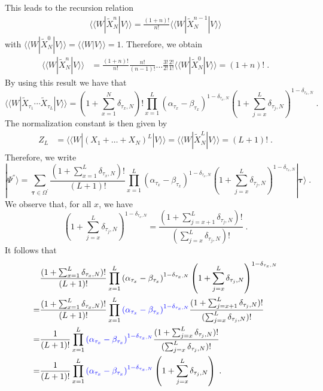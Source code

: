 \documentclass[10pt]{article}
\numberwithin{equation}{section}
\numberwithin{equation}{subsection}
\newcommand{\dt}{\;.}
\newcommand{\fra}[1]{\textcolor[rgb]{0,0,1}{#1}}
\begin{document}
This leads to the recursion relation
\begin{align}
		 \langle \langle W|  \widetilde{X}_{N}^{n} |V\rangle\rangle =\frac{(1+n)!}{n!} \langle \langle W|  \widetilde{X}_{N}^{n-1} |V\rangle\rangle 
\end{align}
with $	 \langle \langle W|  \widetilde{X}_{N}^{0} |V\rangle\rangle=	 \langle \langle W |V\rangle\rangle  =1$. 
Therefore, we obtain 
\begin{align}
	 \langle \langle W|  \widetilde{X}_{N}^{n} |V\rangle\rangle &=
	\frac{(1+n)!}{n!}\frac{n!}{(n-1)!}\ldots \frac{3!}{2!}\frac{2!}{1!} \langle \langle W|  \widetilde{X}_{N}^{0} |V\rangle\rangle =
	(1+n)!\dt
\end{align}
By using this result we have that
\begin{equation}
	 \langle \langle W|  \widetilde{X}_{\tau_{1}}\cdots  \widetilde{X}_{\tau_{L}}
	|V\rangle\rangle=(1+{\textstyle \sum}_{x=1}^{N}\delta_{\tau_{x},N})!\prod_{x=1}^{L}\left(\alpha_{\tau_{x}}-\beta_{\tau_{x}}\right)^{1-\delta_{\tau_{x},N}}\left(1+\sum_{j=x}^{L}\delta_{\tau_{j},N}\right)^{1-\delta_{\tau_{x},N}}\dt
\end{equation}
The normalization constant is then given by
\begin{align}
	Z_{L}&= \langle \langle W|  (X_{1}+\ldots+X_{N})^{L} |V\rangle\rangle = \langle \langle W|  \widetilde{X}_{N}^{L}|V\rangle \rangle=
	(L+1)!\dt
\end{align}
Therefore, we write
\begin{equation}\label{resulEsteady}
	|\Psi^{''}\rangle= \sum_{\bm{\tau}\in \Omega^{'}}\frac{(1+\sum_{x=1}^{L}\delta_{\tau_{x},N})!}{(L+1)!}\prod_{x=1}^{L}\left(\alpha_{\tau_{x}}-\beta_{\tau_{x}}\right)^{1-\delta_{\tau_{x},N}}\left(1+\sum_{j=x}^{L}\delta_{\tau_{j},N}\right)^{1-\delta_{\tau_{x},N}}|\bm{\tau}\rangle\dt
\end{equation}
We observe that, for all $x$, we have
\begin{equation}
	\left(1+\textstyle\sum_{j=x}^{L}\delta_{\tau_{j},N}\right)^{1-\delta_{\tau_{x},N}}=\frac{(1+\sum_{j=x+1}^{L}\delta_{\tau_{j},N})!}{(\sum_{j=x}^{L}\delta_{\tau_{j},N})!}\dt
\end{equation}
It follows that 
\begin{align}\label{remove-exponent}
&\frac{(1+\sum_{x=1}^{L}\delta_{\tau_{x},N})!}{(L+1)!}\prod_{x=1}^{L}\left(\alpha_{\tau_{x}}-\beta_{\tau_{x}}\right)^{1-\delta_{\tau_{x},N}}\left(1+\sum_{j=x}^{L}\delta_{\tau_{j},N}\right)^{1-\delta_{\tau_{x},N}}\nonumber\\
=&\frac{(1+\sum_{x=1}^{L}\delta_{\tau_{x},N})!}{(L+1)!}\prod_{x=1}^{L}\fra{\left(\alpha_{\tau_{x}}-\beta_{\tau_{x}}\right)^{1-\delta_{\tau_{x},N}}}\frac{(1+\sum_{j=x+1}^{L}\delta_{\tau_{j},N})!}{(\sum_{j=x}^{L}\delta_{\tau_{j},N})!}\nonumber\\
=&\frac{1}{(L+1)!}\prod_{x=1}^{L}\fra{\left(\alpha_{\tau_{x}}-\beta_{\tau_{x}}\right)^{1-\delta_{\tau_{x},N}}}\frac{(1+\sum_{j=x}^{L}\delta_{\tau_{j},N})!}{(\sum_{j=x}^{L}\delta_{\tau_{j},N})!}\nonumber\\
=&\frac{1}{(L+1)!}\prod_{x=1}^{L}\fra{\left(\alpha_{\tau_{x}}-\beta_{\tau_{x}}\right)^{1-\delta_{\tau_{x},N}}}\left(1+\sum_{j=x}^{L}\delta_{\tau_{j},N}\right)\dt
\end{align}
\end{document}

